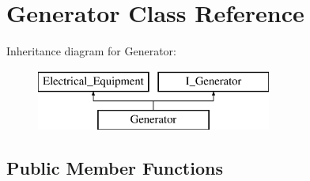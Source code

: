 \hypertarget{class_generator}{}\section{Generator Class Reference}
\label{class_generator}
Inheritance diagram for Generator\+:\begin{figure}[H]
\begin{center}
\leavevmode
\includegraphics[height=2.000000cm]{class_generator}
\end{center}
\end{figure}
\subsection*{Public Member Functions}
